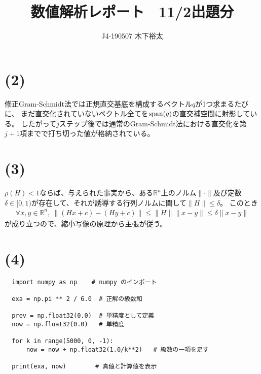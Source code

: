 \documentclass[uplatex,dvipdfmx]{jsarticle}
\title{数値解析レポート　11/2出題分}
\author{J4-190507 木下裕太}
\begin{document}
\maketitle

\section*{(2)}
修正Gram-Schmidt法では正規直交基底を構成するベクトル$q$が1つ求まるたびに、
まだ直交化されていないベクトル全てを${\rm span}(q)$の直交補空間に射影している。
したがって$j$ステップ後では通常のGram-Schmidt法における直交化を第$j+1$項までで打ち切った値が格納されている。

\section*{(3)}
$\rho(H)<1$ならば、与えられた事実から、ある$\mathbb{R}^n$上のノルム$\|\cdot\|$及び定数$\delta\in[0,1)$が存在して、それが誘導する行列ノルムに関して$\|H\|\le\delta$。
このとき
\begin{eqnarray*}
  \forall x,y\in\mathbb{R}^n,\ \|(Hx+c)-(Hy+c)\|\le\|H\|\|x-y\|\le\delta\|x-y\|
\end{eqnarray*}
が成り立つので、縮小写像の原理から主張が従う。

\section*{(4)}
\begin{verbatim}
  import numpy as np    # numpy のインポート

  exa = np.pi ** 2 / 6.0  # 正解の級数和

  prev = np.float32(0.0)  # 単精度として定義
  now = np.float32(0.0)   # 単精度

  for k in range(5000, 0, -1):
      now = now + np.float32(1.0/k**2)   # 級数の一項を足す

  print(exa, now)        # 真値と計算値を表示
\end{verbatim}
\end{document}
